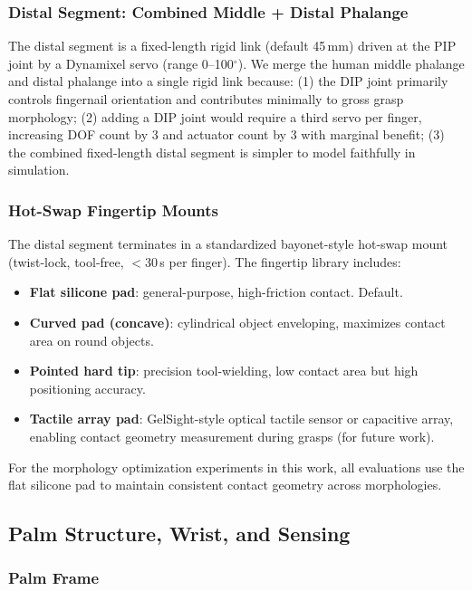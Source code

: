 \documentclass[journal]{IEEEtran}
\begin{document}
\subsubsection{Distal Segment: Combined Middle + Distal Phalange}

The distal segment is a fixed-length rigid link (default 45\,mm) driven at the PIP joint
by a Dynamixel servo (range 0--100$^\circ$).
We merge the human middle phalange and distal phalange into a single rigid link because:
(1) the DIP joint primarily controls fingernail orientation and contributes minimally
to gross grasp morphology; (2) adding a DIP joint would require a third servo per finger,
increasing DOF count by 3 and actuator count by 3 with marginal benefit; (3) the
combined fixed-length distal segment is simpler to model faithfully in simulation.

\subsubsection{Hot-Swap Fingertip Mounts}

The distal segment terminates in a standardized bayonet-style hot-swap mount
(twist-lock, tool-free, $<$30\,s per finger).
The fingertip library includes:
\begin{itemize}
  \item \textbf{Flat silicone pad}: general-purpose, high-friction contact. Default.
  \item \textbf{Curved pad (concave)}: cylindrical object enveloping, maximizes
    contact area on round objects.
  \item \textbf{Pointed hard tip}: precision tool-wielding, low contact area but
    high positioning accuracy.
  \item \textbf{Tactile array pad}: GelSight-style optical tactile sensor or capacitive
    array, enabling contact geometry measurement during grasps (for future work).
\end{itemize}
For the morphology optimization experiments in this work, all evaluations use the flat
silicone pad to maintain consistent contact geometry across morphologies.

\subsection{Palm Structure, Wrist, and Sensing}

\subsubsection{Palm Frame}
\end{document}
